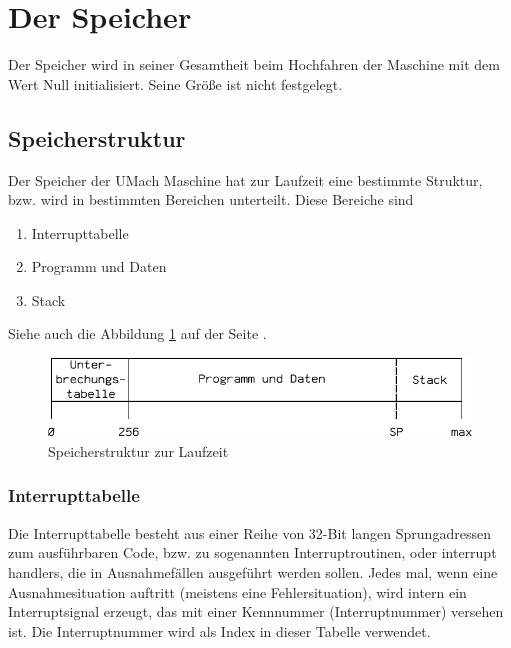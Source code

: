 \section{Der Speicher}
\label{sec:Speicher}

Der Speicher wird in seiner Gesamtheit beim Hochfahren der Maschine mit dem
Wert Null initialisiert. Seine Größe ist nicht festgelegt.



\subsection{Speicherstruktur}

Der Speicher der UMach Maschine hat zur Laufzeit eine bestimmte Struktur, bzw.
wird in bestimmten Bereichen unterteilt. Diese Bereiche sind
\begin{enumerate}
 \item Interrupttabelle
 \item Programm und Daten
 \item Stack
\end{enumerate}

Siehe auch die Abbildung \ref{fig:Speicherstruktur} auf der Seite
\pageref{fig:Speicherstruktur}.

\begin{figure}[htp]
 \centering
 \includegraphics{./img/UMach-Speicherstruktur}
 \caption[Speicherstruktur]{Speicherstruktur zur Laufzeit}
 \label{fig:Speicherstruktur}
\end{figure}



\subsubsection{Interrupttabelle}
\label{subsubsec:Interrupttabelle}

Die Interrupttabelle besteht aus einer Reihe von 32-Bit langen Sprungadressen
zum ausführbaren Code, bzw. zu sogenannten Interruptroutinen, oder \glqq
interrupt handlers\grqq, die in Ausnahmefällen ausgeführt werden sollen. Jedes
mal, wenn eine Ausnahmesituation auftritt (meistens eine Fehlersituation), wird
intern ein Interruptsignal erzeugt, das mit einer Kennnummer (Interruptnummer)
versehen ist. Die Interruptnummer wird als Index in dieser Tabelle verwendet.


